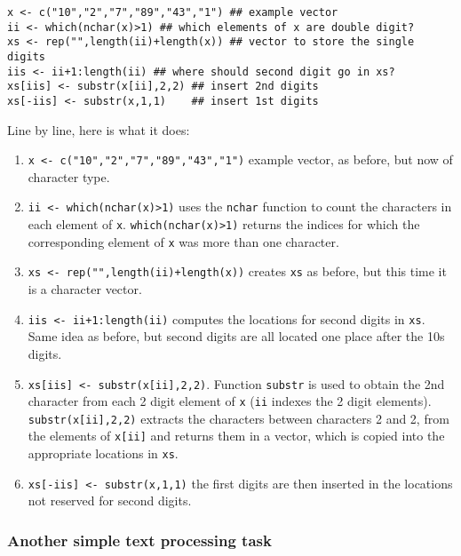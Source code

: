 \documentclass[10pt] {article}
\theoremstyle{definition}
\begin{document}
\begin{verbatim}
x <- c("10","2","7","89","43","1") ## example vector
ii <- which(nchar(x)>1) ## which elements of x are double digit?
xs <- rep("",length(ii)+length(x)) ## vector to store the single digits
iis <- ii+1:length(ii) ## where should second digit go in xs?
xs[iis] <- substr(x[ii],2,2) ## insert 2nd digits
xs[-iis] <- substr(x,1,1)    ## insert 1st digits
\end{verbatim}
Line by line, here is what it does:
\begin{enumerate}
\item \verb+x <- c("10","2","7","89","43","1")+ example vector, as before, but now of character type.
\item \verb+ii <- which(nchar(x)>1)+ uses the {\tt nchar} function to count the characters in each element of {\tt x}. \verb+which(nchar(x)>1)+ returns the indices for which the corresponding element of {\tt x} was more than one character.
\item  \verb^xs <- rep("",length(ii)+length(x))^ creates {\tt xs} as before, but this time it is a character vector.
\item \verb^iis <- ii+1:length(ii)^ computes the locations for second digits in {\tt xs}. Same idea as before, but second digits are all located one place after the 10s digits.
\item \verb+xs[iis] <- substr(x[ii],2,2)+. Function \verb+substr+ is used to obtain the 2nd character from each 2 digit element of {\tt x} ({\tt ii} indexes the 2 digit elements). \verb+substr(x[ii],2,2)+ extracts the characters between characters 2 and 2, from the elements of {\tt x[ii]} and returns them in a vector, which is copied into the appropriate locations in {\tt xs}.
\item \verb+xs[-iis] <- substr(x,1,1)+ the first digits are then inserted in the locations not reserved for second digits. 
\end{enumerate}

\subsubsection{Another simple text processing task}
\end{document}
